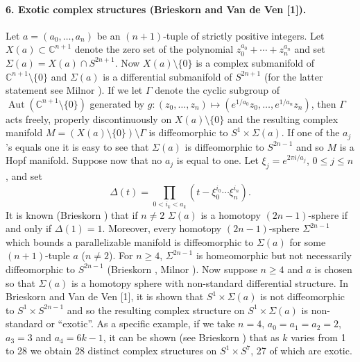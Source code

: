 \paragraph*{6. Exotic complex structures (Brieskorn and Van de Ven [1]).} Let $a=(a_0,\ldots,a_n)$ be an $(n+1)$-tuple of strictly positive integers. Let $X(a)\subset\mathbb C^{n+1}$ denote the zero set of the polynomial $z_0^{a_0}+\cdots+z_n^{a_n}$ and set $\Sigma(a)=X(a)\cap S^{2n+1}$. Now $X(a)\setminus\{0\}$ is a complex submanifold of $\mathbb C^{n+1}\setminus\{0\}$ and $\Sigma(a)$ is a differential submanifold of $S^{2n+1}$ (for the latter statement see Milnor \cite{bib:I:milnor-j-w:2}). If we let $\Gamma$ denote the cyclic subgroup of $\operatorname{Aut}(\mathbb C^{n+1}\setminus\{0\})$ generated by $g:(z_0,\ldots,z_n)\longmapsto(e^{1/a_0}z_0,\ldots,e^{1/a_n}z_n)$, then $\Gamma$ acts freely, properly discontinuously on $X(a)\setminus\{0\}$ and the resulting complex manifold $M=(X(a)\setminus\{0\})\setminus\Gamma$ is diffeomorphic to $S^1\times\Sigma(a)$. If one of the $a_j$'s equals one it is easy to see that $\Sigma(a)$ is diffeomorphic to $S^{2n-1}$ and so $M$ is a Hopf manifold. Suppose now that no $a_j$ is equal to one. Let $\xi_j=e^{2\pi i/a_j}$, $0\leq j\leq n$, and set
\[
\Delta(t)=\prod_{0<i_k<a_k}(t-\xi_0^{i_0}\cdots\xi_n^{i_n}).
\]
It is known (Brieskorn \cite{bib:I:brieskorn-e:1}) that if $n\neq2$ $\Sigma(a)$ is a homotopy $(2n-1)$-sphere if and only if $\Delta(1)=1$. Moreover, every homotopy $(2n-1)$-sphere $\Sigma^{2n-1}$ which bounds a parallelizable manifold is diffeomorphic to $\Sigma(a)$ for some $(n+1)$-tuple $a$ ($n\neq2$). For $n\geq4$, $\Sigma^{2n-1}$ is homeomorphic but not necessarily diffeomorphic to $S^{2n-1}$ (Brieskorn \cite{bib:I:brieskorn-e:1}, Milnor \cite{bib:I:milnor-j-w:3}). Now suppose $n\geq4$ and $a$ is chosen so that $\Sigma(a)$ is a homotopy sphere with non-standard differential structure. In Brieskorn and Van de Ven [1], it is shown that $S^1\times\Sigma(a)$ is not diffeomorphic to $S^1\times S^{2n-1}$ and so the resulting complex structure on $S^1\times\Sigma(a)$ is non-standard or ``exotic''. As a specific example, if we take $n=4$, $a_0=a_1=a_2=2$, $a_3=3$ and $a_4=6k-1$, it can be shown (see Brieskorn \cite{bib:I:brieskorn-e:1}) that as $k$ varies from 1 to 28 we obtain 28 distinct
complex structures on $S^1\times S^7$, 27 of which are exotic.

